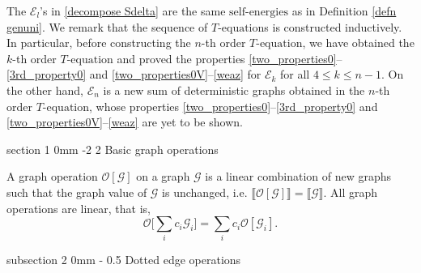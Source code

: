 \documentclass{article}
\makeatletter
\newcommand{\1}{\mathds{1}}
\numberwithin{equation}{section}
\newcommand{\be}{\begin{equation}}
\newcommand{\ee}{\end{equation}}
\renewcommand{\cal}{\mathcal}
\renewcommand{\leq}{\leqslant}
\renewcommand{\le}{\leq}
\newcommand{\selfs}{\text{self-energies}}
\theoremstyle{plain} %
\theoremstyle{remark}
\newcommand{\cor}{\color{red}}
\newcommand{\Sele}{{\mathcal E}}
\newcommand{\incomp}{{\text{$T$-equation}}}
\renewcommand{\section}{\@startsection
{section}%
{1}%
{0mm}%
{-2\baselineskip}%
{2\baselineskip}%
{\normalfont\large\scshape\centering}} %
\renewcommand{\subsection}{\@startsection
{subsection}%
{2}%
{0mm}%
{-\baselineskip}%
{0.5\baselineskip}%
{\normalfont\bf\itshape}} %
\newcommand{\hty}[1]{{\cor (ht: #1) }}
\makeatother
\begin{document}
The $\Sele_l$'s in \eqref{decompose Sdelta} are the same $\selfs$ as in Definition \ref{defn genuni}. 
We remark that the sequence of $\incomp$s is constructed inductively. In particular, before constructing the $n$-th order $\incomp$, we have obtained the $k$-th order $\incomp$ and proved the properties \eqref{two_properties0}--\eqref{3rd_property0} and \eqref{two_properties0V}--\eqref{weaz} for $\Sele_k$ for all $4\le k\le n-1$. On the other hand, $ \Sele_n$ is a new sum of deterministic graphs obtained in the $n$-th order $\incomp$, whose properties \eqref{two_properties0}--\eqref{3rd_property0} and \eqref{two_properties0V}--\eqref{weaz} are yet to be shown.  %
	



\section{Basic graph operations}\label{sec_basiclocal}


A graph operation $\cal O[\cal G]$ on a graph $\cal G$ is a linear combination of new graphs such that the graph value of  $\cal G$ 
is unchanged, i.e. $\llbracket \cal O[\cal G]\rrbracket=\llbracket \cal G\rrbracket$. 
All graph operations are linear, that is, %
\be\label{linear graphO} \cal O\Big[\sum_i c_i  \cal G_i\Big] =\sum_i c_i \cal O\left[ \cal G_i\right].
\ee

\subsection{Dotted edge operations} 
\end{document}
